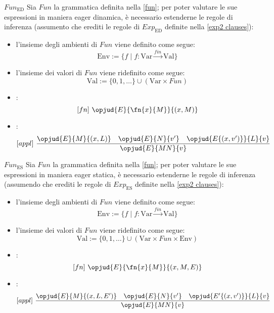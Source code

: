 \documentclass[a4paper, 12pt]{report}
\begin{document}
    \begin{framedprop}{$Fun_\mathrm{ED}$}
        Sia $Fun$ la grammatica definita nella \cref{fun}; per poter valutare le sue espressioni in maniera eager dinamica, è necessario estenderne le regole di inferenza (assumento che erediti le regole di $Exp_\mathrm{ED}$ definite nella \cref{exp2 clauses}):

        \begin{itemize}
            \item l'insieme degli ambienti di $Fun$ viene definito come segue: $$\mathrm{Env} := \{f \mid f : \mathrm{Var} \xrightarrow{fin} \mathrm{Val}\}$$
            \item l'insieme dei valori di $Fun$ viene ridefinito come segue: $$\mathrm{Val} := \{  0,  1 , \ldots \} \cup (\mathrm{Var} \times Fun)$$                   \item {}: $$[fn] \ \opjud{E}{\fn{x}{M}}{(x,M)}$$
            \item {}: $$[appl] \ \dfrac{\opjud{E}{M}{(x,L)} \quad \opjud{E}{N}{v'} \quad \opjud{E\{(x,v')\}}{L}{v}}{\opjud{E}{MN}{v}}$$
        \end{itemize}
    \end{framedprop}

    \begin{framedprop}[breakable]{$Fun_\mathrm{ES}$}
        Sia $Fun$ la grammatica definita nella \cref{fun}; per poter valutare le sue espressioni in maniera eager statica, è necessario estenderne le regole di inferenza (assumendo che erediti le regole di $Exp_\mathrm{ES}$ definite nella \cref{exp2 clauses}):

        \begin{itemize}
            \item l'insieme degli ambienti di $Fun$ viene definito come segue: $$\mathrm{Env} := \{f \mid f : \mathrm{Var} \xrightarrow{fin} \mathrm{Val}\}$$
            \item l'insieme dei valori di $Fun$ viene ridefinito come segue: $$\mathrm{Val} := \{  0, 1, \ldots \} \cup (\mathrm{Var} \times Fun \times \mathrm{Env})$$
            \item {}: $$[fn] \ \opjud{E}{\fn{x}{M}}{(x,M,E)}$$
            \item {}: $$[appl] \ \dfrac{\opjud{E}{M}{(x, L, E')} \quad \opjud{E}{N}{v'} \quad \opjud{E'\{(x,v')\}}{L}{v}}{\opjud{E}{MN}{v}}$$
        \end{itemize}
    \end{framedprop}
\end{document}
